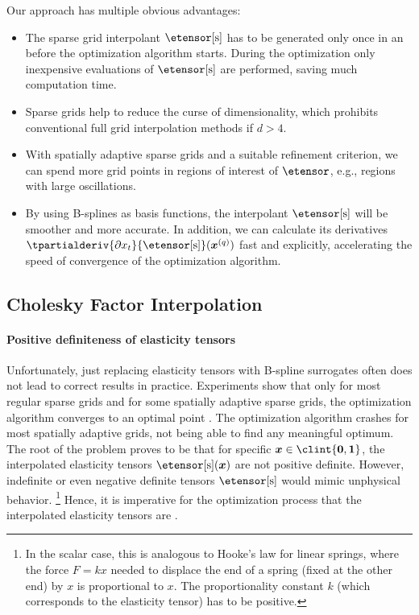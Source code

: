 Our approach has multiple obvious advantages:
\begin{itemize}
  \item
  The sparse grid interpolant $\etensor[\sparse]$ has to be generated only
  once in an  before the optimization algorithm starts.
  During the optimization 
  only inexpensive evaluations of $\etensor[\sparse]$ are performed,
  saving much computation time.
  
  \item
  Sparse grids help to reduce the curse of dimensionality, which prohibits
  conventional full grid interpolation methods if $d > 4$.
  
  \item
  With spatially adaptive sparse grids and a suitable refinement criterion,
  we can spend more grid points in regions of interest of $\etensor$,
  e.g., regions with large oscillations.
  
  \item
  By using B-splines as basis functions,
  the interpolant $\etensor[\sparse]$ will be smoother and more accurate.
  In addition, we can calculate its derivatives
  $\tpartialderiv{\partialdiff{} x_t}{\etensor[\sparse]}(\*x^{(q)})$
  fast and explicitly,
  accelerating the speed of convergence of the optimization algorithm.
\end{itemize}



\subsection{Cholesky Factor Interpolation}
\label{sec:623cholesky}

\paragraph{Positive definiteness of elasticity tensors}

Unfortunately, just replacing elasticity tensors with
B-spline surrogates often does not lead to correct results in practice.
Experiments show that only for most regular sparse grids and
for some spatially adaptive sparse grids,
the optimization algorithm converges to an optimal point
\cite{Valentin16Hierarchical}.
The optimization algorithm crashes for most spatially adaptive grids,
not being able to find any meaningful optimum.
%
The root of the problem proves to be that for specific
$\*x \in \clint{\*0, \*1}$,
the interpolated elasticity tensors $\etensor[\sparse](\*x)$ are not
positive definite.
However, indefinite or even negative definite tensors $\etensor[\sparse]$
would mimic unphysical behavior.%
\footnote{%
  In the scalar case, this is analogous to Hooke's law for linear springs,
  where the force $F = kx$ needed to displace the end of a spring
  (fixed at the other end) by $x$ is proportional to $x$.
  The proportionality constant $k$ (which corresponds to the elasticity tensor)
  has to be positive.%
}
Hence, it is imperative for the optimization process that
the interpolated elasticity tensors are \spd.

